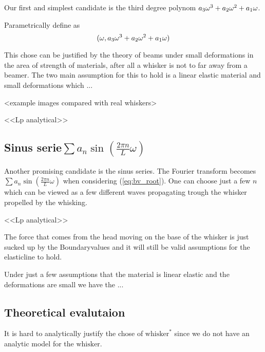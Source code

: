     Our first and simplest candidate is the third degree polynom $a_3\omega^3+a_2\omega^2+a_1\omega$.

    Parametrically define as
    \begin{equation}
        (\omega,a_3\omega^3+a_2\omega^2+a_1\omega)
    \end{equation}

    This chose can be justified by the theory of beams under small deformations 
    in the area of strength of materials, after all a whisker is not to far 
    away from a beamer\cite{Hallfasthet}. The two main assumption
    for this to hold is a linear elastic material and small deformations which
    ...

    <example images compared with real whiskers>

    <<Lp analytical>>

\subsection{Sinus serie$\sum{a_n\sin (\frac{2\pi n}{L}\omega)}$}
    Another promising candidate is the sinus series.
    The Fourier transform becomes $\sum{a_n\sin (\frac{2\pi n}{L}\omega)}$ when
    considering (\ref{eq:bv_root}). One can choose just a few $n$ which can be
    viewed as a few different waves propagating trough the whisker propelled by
    the whisking. 

    <<Lp analytical>>


The force that comes from the head moving on the base of the whisker is just 
sucked up by the Boundaryvalues and it will still be valid assumptions for the
elasticline to hold.

Under just a few assumptions that the material is linear elastic and the
deformations are small we have the ...

\subsection{Theoretical evalutaion}
    It is hard to analytically justify the chose of $\text{whisker}^*$ since we do not
    have an analytic model for the $\text{whisker}$.


